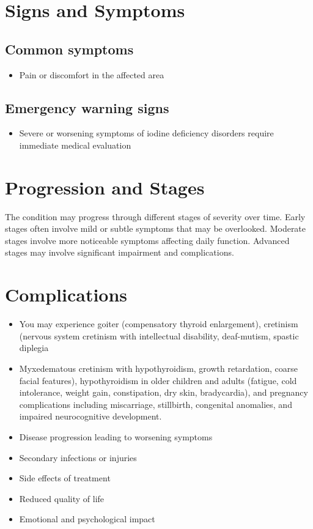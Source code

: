 \section{Signs and Symptoms}

\subsection{Common symptoms}
\begin{itemize}[noitemsep]
  \item Pain or discomfort in the affected area
  \end{itemize}

\subsection{Emergency warning signs}
\begin{itemize}[noitemsep]
  \item Severe or worsening symptoms of iodine deficiency disorders require immediate medical evaluation
\end{itemize}
\section{Progression and Stages}
The condition may progress through different stages of severity over time. Early stages often involve mild or subtle symptoms that may be overlooked. Moderate stages involve more noticeable symptoms affecting daily function. Advanced stages may involve significant impairment and complications.
\section{Complications}
\begin{itemize}[noitemsep]
  \item You may experience goiter (compensatory thyroid enlargement), cretinism (nervous system cretinism with intellectual disability, deaf-mutism, spastic diplegia
  \item Myxedematous cretinism with hypothyroidism, growth retardation, coarse facial features), hypothyroidism in older children and adults (fatigue, cold intolerance, weight gain, constipation, dry skin, bradycardia), and pregnancy complications including miscarriage, stillbirth, congenital anomalies, and impaired neurocognitive development.
  \item Disease progression leading to worsening symptoms
  \item Secondary infections or injuries
  \item Side effects of treatment
  \item Reduced quality of life
  \item Emotional and psychological impact
\end{itemize}

